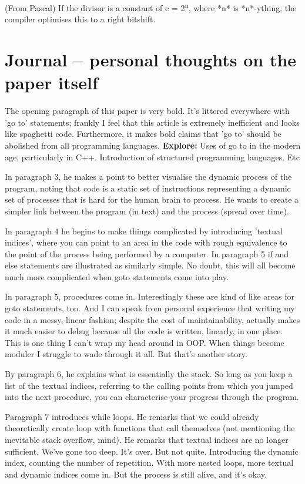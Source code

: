 \documentclass{journal}
\begin{document}
(From Pascal) If the divisor is a constant of c = 2\textsuperscript{n}, where *n* is *n*-ything, the compiler optimises this to a right bitshift.

\section{Journal -- personal thoughts on the paper itself}
The opening paragraph of this paper is very bold. It's littered everywhere with 'go to' statements; frankly I feel that this article is extremely inefficient and looks like spaghetti code. Furthermore, it makes bold claims that 'go to' should be abolished from all programming languages. \textbf{Explore:} Uses of go to in the modern age, particularly in C++. Introduction of structured programming languages. Etc

In paragraph 3, he makes a point to better visualise the dynamic process of the program, noting that code is a static set of instructions representing a dynamic set of processes that is hard for the human brain to process. He wants to create a simpler link between the program (in text) and the process (spread over time).

In paragraph 4 he begins to make things complicated by introducing 'textual indices', where you can point to an area in the code with rough equivalence to the point of the process being performed by a computer. In paragraph 5 if and else statements are illustrated as similarly simple. No doubt, this will all become much more complicated when goto statements come into play.

In paragraph 5, procedures come in. Interestingly these are kind of like areas for goto statements, too. And I can speak from personal experience that writing my code in a messy, linear fashion; despite the cost of maintainability, actually makes it much easier to debug because all the code is written, linearly, in one place. This is one thing I can't wrap my head around in OOP. When things become moduler I struggle to wade through it all. But that's another story.

By paragraph 6, he explains what is essentially the stack. So long as you keep a list of the textual indices, referring to the calling points from which you jumped into the next procedure, you can characterise your progress through the program.

Paragraph 7 introduces while loops. He remarks that we could already theoretically create loop with functions that call themselves (not mentioning the inevitable stack overflow, mind). He remarks that textual indices are no longer sufficient. We've gone too deep. It's over. But not quite. Introducing the dynamic index, counting the number of repetition. With more nested loops, more textual and dynamic indices come in. But the process is still alive, and it's okay.
\end{document}
